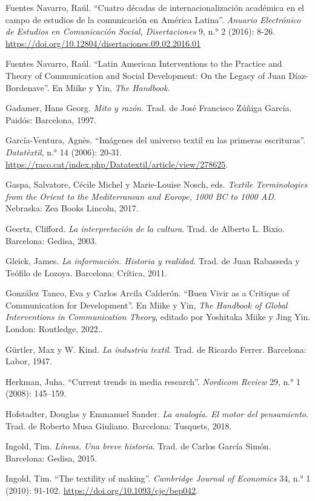 \documentclass{tufte-handout}
\begin{document}
\begin{hangparas}{.25in}{1}
Fuentes Navarro, Raúl. ``Cuatro décadas de internacionalización
académica en el campo de estudios de la comunicación en América
Latina''. \emph{Anuario Electrónico de Estudios en Comunicación Social,
Disertaciones} 9, n.° 2 (2016): 8-26.
\url{https://doi.org/10.12804/disertaciones.09.02.2016.01}

Fuentes Navarro, Raúl. ``Latin American Interventions to the Practice and Theory of
Communication and Social Development: On the Legacy of Juan
Díaz-Bordenave''. En Miike y Yin, \emph{The Handbook}.

Gadamer, Hans Georg. \emph{Mito y razón}. Trad. de José Francisco Zúñiga
García. Paidós: Barcelona, 1997.

García-Ventura, Agnès. ``Imágenes del universo textil en las primeras
escrituras''. \emph{Datatèxtil}, n.° 14 (2006): 20-31.
\url{https://raco.cat/index.php/Datatextil/article/view/278625}.

Gaspa, Salvatore, Cécile Michel y Marie-Louise Nosch, eds. \emph{Textile
Terminologies from the Orient to the Mediterranean and Europe, 1000 BC
to 1000 AD}. Nebraska: Zea Books Lincoln, 2017.

Geertz, Clifford. \emph{La interpretación de la cultura}. Trad. de
Alberto L. Bixio. Barcelona: Gedisa, 2003.

Gleick, James. \emph{La información. Historia y realidad}. Trad. de Juan
Rabasseda y Teófilo de Lozoya. Barcelona: Crítica, 2011.

González Tanco, Eva y Carlos Arcila Calderón. ``Buen Vivir as a Critique
of Communication for Development''. En Miike y Yin, \emph{The Handbook of Global Interventions in Communication Theory}, editado por Yoshitaka Miike y Jing Yin. London: Routledge, 2022..

Gürtler, Max y W. Kind. \emph{La industria textil}. Trad. de Ricardo
Ferrer. Barcelona: Labor, 1947.

Herkman, Juha. ``Current trends in media research''. \emph{Nordicom
Review} 29, n.° 1 (2008): 145--159.

Hofstadter, Douglas y Emmanuel Sander. \emph{La analogía. El motor del
pensamiento}. Trad. de Roberto Musa Giuliano. Barcelona: Tusquets, 2018.

Ingold, Tim. \emph{Líneas.} \emph{Una breve historia}. Trad. de Carlos
García Simón. Barcelona: Gedisa, 2015.

Ingold, Tim. ``The textility of making''. \emph{Cambridge Journal of
Economics} 34, n.° 1 (2010): 91-102. \url{https://doi.org/10.1093/cje/bep042}.


\end{hangparas}
\end{document}
